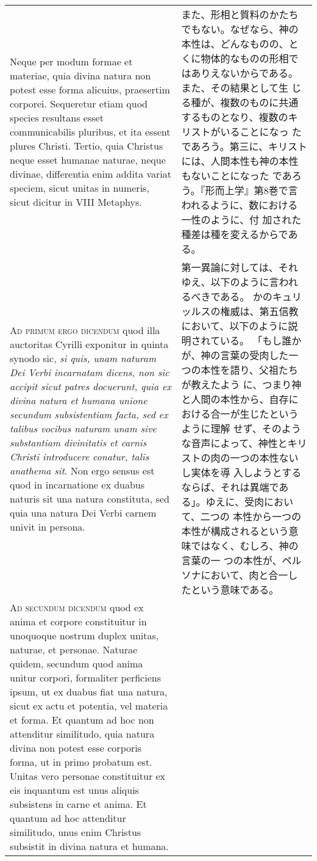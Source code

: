 \documentclass[10pt]{jsarticle} %
\begin{document}
\begin{longtable}{p{21em}p{21em}}
\\


Neque per modum formae et materiae, quia divina natura non
potest esse forma alicuius, praesertim corporei. Sequeretur etiam quod
species resultans esset communicabilis pluribus, et ita essent plures
Christi. Tertio, quia Christus neque esset humanae naturae, neque
divinae, differentia enim addita variat speciem, sicut unitas in
numeris, sicut dicitur in VIII Metaphys.


&

また、形相と質料のかたちでもない。なぜなら、神の本性は、どんなものの、と
 くに物体的なものの形相ではありえないからである。また、その結果として生
 じる種が、複数のものに共通するものとなり、複数のキリストがいることになっ
 たであろう。第三に、キリストには、人間本性も神の本性もないことになった
 であろう。『形而上学』第8巻で言われるように、数における一性のように、付
 加された種差は種を変えるからである。


\\



{\scshape Ad primum ergo dicendum} quod illa auctoritas Cyrilli exponitur in quinta
synodo sic, {\itshape si quis, unam naturam Dei Verbi incarnatam dicens, non sic
accipit sicut patres docuerunt, quia ex divina natura et humana unione
secundum subsistentiam facta, sed ex talibus vocibus naturam unam sive
substantiam divinitatis et carnis Christi introducere conatur, talis
anathema sit}. Non ergo sensus est quod in incarnatione ex duabus naturis
sit una natura constituta, sed quia una natura Dei Verbi carnem univit
in persona.


&

第一異論に対しては、それゆえ、以下のように言われるべきである。
かのキュリッルスの権威は、第五信教において、以下のように説明されている。
 「もし誰かが、神の言葉の受肉した一つの本性を語り、父祖たちが教えたよう
 に、つまり神と人間の本性から、自存における合一が生じたというように理解
 せず、そのような音声によって、神性とキリストの肉の一つの本性ないし実体を導
 入しようとするならば、それは異端である」。ゆえに、受肉において、二つの
 本性から一つの本性が構成されるという意味ではなく、むしろ、神の言葉の一
 つの本性が、ペルソナにおいて、肉と合一したという意味である。

\\



{\scshape Ad secundum dicendum} quod ex anima et corpore constituitur in unoquoque
nostrum duplex unitas, naturae, et personae. Naturae quidem, secundum
quod anima unitur corpori, formaliter perficiens ipsum, ut ex duabus
fiat una natura, sicut ex actu et potentia, vel materia et forma. Et
quantum ad hoc non attenditur similitudo, quia natura divina non potest
esse corporis forma, ut in primo probatum est. Unitas vero personae
constituitur ex eis inquantum est unus aliquis subsistens in carne et
anima. Et quantum ad hoc attenditur similitudo, unus enim Christus
subsistit in divina natura et humana.



\end{longtable}
\end{document}
